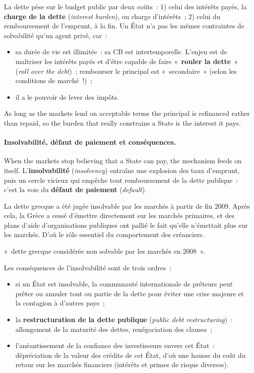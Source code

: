 La dette pèse sur le budget public par deux coûts~: 1) celui des intérêts payés,
la \textbf{charge de la dette} (\textit{interest burden}), ou charge d'intérêts~;
2) celui du remboursement de l'emprunt, à la fin. Un État n'a pas les mêmes
contraintes de solvabilité qu'un agent privé, car~:
\begin{itemize}
  \item sa durée de vie est illimitée~: sa CB est intertemporelle. L'enjeu est
    de maîtriser les intérêts payés et d'être capable de faire
    «~\textbf{rouler la dette}~» (\textit{roll over the debt})~; rembourser le
    principal est «~secondaire~» (selon les conditions de marché~!)~;
  \item il a le pouvoir de lever des impôts.
\end{itemize}
As long as the markets lend on acceptable terms the principal is
refinanced rather than repaid, so the burden that really constrains a State is
the interest it pays.

\paragraph{Insolvabilité, défaut de paiement et conséquences.}
When the markets stop believing that a State can pay, the mechanism feeds on
itself. L'\textbf{insolvabilité} (\textit{insolvency}) entraîne une explosion
des taux d'emprunt, puis un cercle vicieux qui empêche tout remboursement de la
dette publique~: c'est la voie du \textbf{défaut de paiement}
(\textit{default}).

\begin{example}
  La dette grecque a été jugée insolvable par les marchés à partir de fin 2009.
  Après cela, la Grèce a cessé d'émettre directement sur les marchés primaires,
  et des plans d'aide d'organisations publiques ont pallié le fait qu'elle
  n'émettait plus sur les marchés. D'où le rôle essentiel du comportement des
  créanciers.
\end{example}

\begin{remark}
  «~dette grecque considérée non solvable par les marchés en 2008~».
\end{remark}

Les conséquences de l'insolvabilité sont de trois ordres~:
\begin{itemize}
  \item si un État est insolvable, la communauté internationale de prêteurs peut
    prêter ou annuler tout ou partie de la dette pour éviter une crise majeure et
    la contagion à d'autres pays~;
  \item la \textbf{restructuration de la dette publique} (\textit{public debt
    restructuring})~: allongement de la maturité des dettes, renégociation des
    clauses~;
  \item l'anéantissement de la confiance des investisseurs envers cet État~:
    dépréciation de la valeur des crédits de cet État, d'où une hausse du coût du
    retour sur les marchés financiers (intérêts et primes de risque diverses).
\end{itemize}

